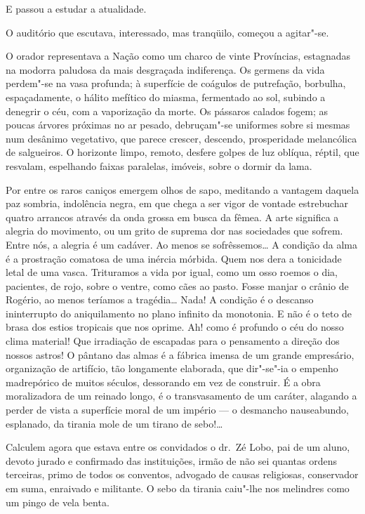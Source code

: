 E passou a estudar a atualidade. 

O auditório que
escutava, interessado, mas tranqüilo, começou a agitar"-se. 

O orador
representava a Nação como um charco de vinte Províncias, estagnadas na
modorra paludosa da mais desgraçada indiferença. Os germens da vida
perdem"-se na vasa profunda; à superfície de coágulos de putrefação,
borbulha, espaçadamente, o hálito mefítico do miasma, fermentado ao
sol, subindo a denegrir o céu, com a vaporização da morte. Os pássaros
calados fogem; as poucas árvores próximas no ar pesado, debruçam"-se
uniformes sobre si mesmas num desânimo vegetativo, que parece crescer,
descendo, prosperidade melancólica de salgueiros. O horizonte limpo,
remoto, desfere golpes de luz oblíqua, réptil, que resvalam, espelhando
faixas paralelas, imóveis, sobre o dormir da lama. 

Por entre os raros
caniços emergem olhos de sapo, meditando a vantagem daquela paz
sombria, indolência negra, em que chega a ser vigor de vontade estrebuchar 
quatro arrancos através da onda grossa em busca da fêmea. A arte significa a
alegria do movimento, ou um grito de suprema dor nas sociedades que
sofrem. Entre nós, a alegria é um cadáver. Ao menos se sofrêssemos\ldots{} A
condição da alma é a prostração comatosa de uma inércia mórbida. Quem
nos dera a tonicidade letal de uma vasca. Trituramos a vida por igual, 
como um osso roemos o dia, pacientes, de rojo, sobre o ventre, como
cães ao pasto. Fosse manjar o crânio de Rogério, ao menos teríamos a
tragédia\ldots{} Nada! A condição é o descanso ininterrupto do aniquilamento
no plano infinito da monotonia. E não é o teto de brasa dos estios
tropicais que nos oprime. Ah! como é profundo o céu do nosso clima
material! Que irradiação de escapadas para o pensamento a direção dos
nossos astros! O pântano das almas é a fábrica imensa de um grande
empresário, organização de artifício, tão longamente elaborada, que
dir"-se"-ia o empenho madrepórico de muitos séculos, dessorando em vez
de construir. É a obra moralizadora de um reinado longo, é o
transvasamento de um caráter, alagando a perder de vista a superfície
moral de um império --- o desmancho nauseabundo, esplanado, da tirania
mole de um tirano de sebo!\ldots{} 

Calculem agora que estava entre os
convidados o dr.~Zé Lobo, pai de um aluno, devoto jurado e confirmado
das instituições, irmão de não sei quantas ordens terceiras, primo de
todos os conventos, advogado de causas religiosas, conservador em suma,
enraivado e militante. O sebo da tirania caiu"-lhe nos melindres como um
pingo de vela benta. 

